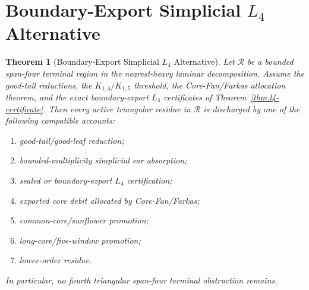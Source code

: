 \documentclass[11pt]{article}
\newtheorem{theorem}{Theorem}[section]
\theoremstyle{definition}
\newcommand{\calR}{\mathcal R}
\begin{document}
\section{Boundary-Export Simplicial \(L_4\) Alternative}

\begin{theorem}[Boundary-Export Simplicial \(L_4\) Alternative]
\label{thm:boundary-export-simplicial-l4}
Let \(\calR\) be a bounded span-four terminal region in the nearest-heavy laminar decomposition. Assume the good-tail reductions, the \(K_{1,4}/K_{1,5}\) threshold, the Core-Fan/Farkas allocation theorem, and the exact boundary-export \(L_4\) certificates of Theorem~\ref{thm:l4-certificate}. Then every active triangular residue in \(\calR\) is discharged by one of the following compatible accounts:
\begin{enumerate}[label=(\roman*)]
    \item good-tail/good-leaf reduction;
    \item bounded-multiplicity simplicial ear absorption;
    \item sealed or boundary-export \(L_4\) certification;
    \item exported core debit allocated by Core-Fan/Farkas;
    \item common-core/sunflower promotion;
    \item long-core/five-window promotion;
    \item lower-order residue.
\end{enumerate}
In particular, no fourth triangular span-four terminal obstruction remains.
\end{theorem}
\end{document}
